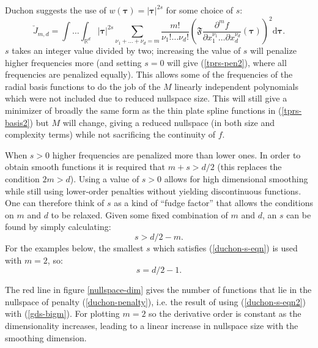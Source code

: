Duchon suggests the use of $w(\boldsymbol{\tau})= \lvert \boldsymbol{\tau} \rvert^{2s}$ for some choice of $s$\label{cor-5s5}:
\begin{equation}
\breve{J}_{m,d} = \int \ldots \int_{\mathbb{R}^d} \lvert \boldsymbol{\tau} \rvert^{2s} \sum_{\nu_1 + \dots + \nu_d=m} \frac{m!}{\nu_1! \dots \nu_d!}\left ( \mathfrak{F} \frac{\partial^m f}{\partial x_1^{\nu_1} \ldots  \partial x_d^{\nu_d}} \left (\boldsymbol{\tau} \right ) \right )^2 \text{d} \boldsymbol{\tau}.
\label{duchon-penalty}
\end{equation}
 $s$ takes an integer value divided by two; increasing the value of $s$ will penalize higher frequencies more (and setting $s=0$ will give (\ref{tprs-pen2}), where all frequencies are penalized equally). This allows some of the \label{cor-r50}frequencies of  the radial basis functions to do the job of the $M$ linearly independent polynomials which were not included due to reduced nullspace size. This will still give a minimizer of broadly the same form as the thin plate spline functions in (\ref{tprs-basis2}) but $M$ will change, giving a reduced nullspace (in both size and complexity terms) while not sacrificing the continuity of $f$. 

When $s>0$ higher frequencies are penalized more than lower ones. In order to obtain smooth functions it is required that $m+s>d/2$ (this replaces the condition $2m>d$). Using a value of $s>0$ allows for high dimensional smoothing while still using lower-order penalties without yielding discontinuous functions. One can therefore think of $s$ as a kind of ``fudge factor'' that allows the conditions on $m$ and $d$ to be relaxed. Given some fixed combination of $m$ and $d$, an $s$ can be found by simply calculating:
\begin{equation}
s>d/2-m.
\label{duchon-s-eqn}
\end{equation}
For the examples below, the smallest $s$ which satisfies (\ref{duchon-s-eqn}) is used with $m=2$, so\label{cor-5s6}:
\begin{equation}
s=d/2-1.
\label{duchon-s-eqn2}
\end{equation}

The red line in figure \ref{nullspace-dim} gives the number of functions that lie in the nullspace of penalty (\ref{duchon-penalty}), i.e. the result of using (\ref{duchon-s-eqn2}) with (\ref{gds-bigm}). For plotting $m=2$ so the derivative order is constant as the dimensionality increases, leading to a linear increase in nullspace size with the smoothing dimension.

